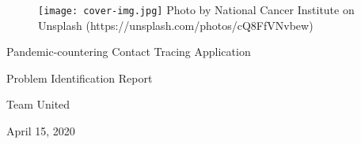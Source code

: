 \thispagestyle{empty}
\vspace*{\fill}
\begin{center}
  \begin{figure}[h]
    \texttt{[image: cover-img.jpg]}
    \centering
    {\footnotesize Photo by National Cancer Institute on Unsplash (https://unsplash.com/photos/cQ8FfVNvbew)}
  \end{figure}

  \vspace{2cm}

  \par {\huge Pandemic-countering Contact Tracing Application}
  \vspace{0.65cm}
  \par {\fontsize{40}{48}\selectfont Problem Identification Report}
  \vspace{0.5cm}
  \par {\LARGE Team United}
  \vspace{0.25cm}
  \par {\large  April 15, 2020}
\end{center}
\vspace*{\fill}